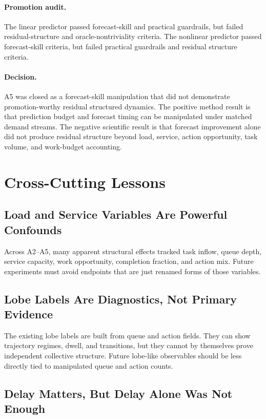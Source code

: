 \documentclass[11pt]{article}
\begin{document}
\paragraph{Promotion audit.}
The linear predictor passed forecast-skill and practical guardrails, but failed
residual-structure and oracle-nontriviality criteria. The nonlinear predictor
passed forecast-skill criteria, but failed practical guardrails and residual
structure criteria.

\paragraph{Decision.}
A5 was closed as a forecast-skill manipulation that did not demonstrate
promotion-worthy residual structured dynamics. The positive method result is
that prediction budget and forecast timing can be manipulated under matched
demand streams. The negative scientific result is that forecast improvement
alone did not produce residual structure beyond load, service, action
opportunity, task volume, and work-budget accounting.

\section{Cross-Cutting Lessons}

\subsection{Load and Service Variables Are Powerful Confounds}

Across A2--A5, many apparent structural effects tracked task inflow, queue
depth, service capacity, work opportunity, completion fraction, and action mix.
Future experiments must avoid endpoints that are just renamed forms of those
variables.

\subsection{Lobe Labels Are Diagnostics, Not Primary Evidence}

The existing lobe labels are built from queue and action fields. They can show
trajectory regimes, dwell, and transitions, but they cannot by themselves prove
independent collective structure. Future lobe-like observables should be less
directly tied to manipulated queue and action counts.

\subsection{Delay Matters, But Delay Alone Was Not Enough}
\end{document}
